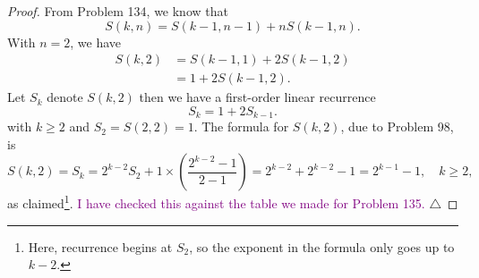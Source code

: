 \documentclass[11pt]{article}
\newcommand{\f}[2]{\frac{#1}{#2}}
\begin{document}
\begin{enumerate}[(a)]
	
	\begin{proof}
		From Problem 134, we know that 
		\begin{equation*}
		S(k,n) = S(k-1, n-1) + nS(k-1,n).
		\end{equation*}
		With $n=2$, we have
		\begin{align*}
		S(k,2) &= S(k-1, 1) + 2S(k-1,2)\\
		&= 1 + 2S(k-1,2).
		\end{align*}
		Let $S_k$ denote $S(k,2)$ then we have a first-order linear recurrence
		\begin{equation*}
		S_k = 1 + 2S_{k-1}.
		\end{equation*}
		with $k\geq 2$ and  $S_2 = S(2,2) = 1$. The formula for $S(k,2)$, due to Problem 98, is
		\begin{equation*}
		S(k,2) = S_k = 2^{k-2} S_2 + 1\times \left(\f{2^{k-2}-1}{2-1}\right) = 2^{k-2} +  2^{k-2}-1 = 2^{k-1}-1, \quad k \geq 2,
		\end{equation*}
		as claimed\footnote{Here, recurrence begins at $S_2$, so the exponent in the formula only goes up to $k-2$.}. \textcolor{purple}{I have checked this against the table we made for Problem 135. \textcolor{black}{$\triangle$}} 
		
		
		

\end{proof}
\end{enumerate}
\end{document}

